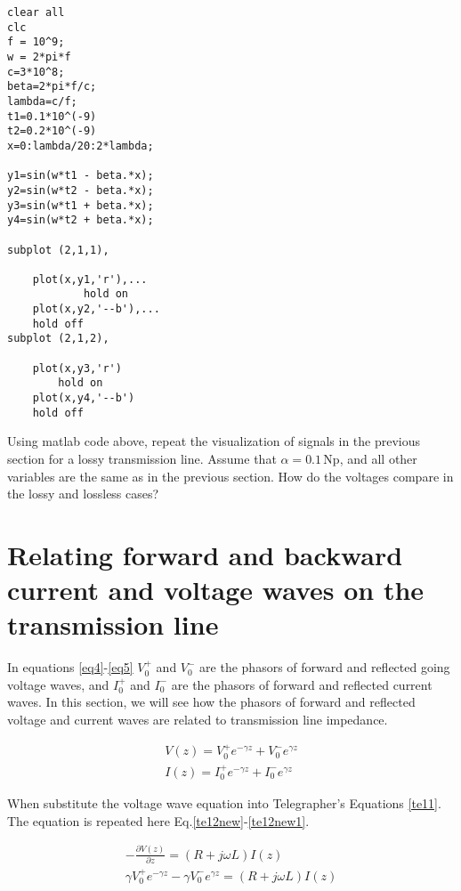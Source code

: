 \documentclass{ximera}
\begin{document}
\begin{verbatim}
clear all
clc
f = 10^9;
w = 2*pi*f
c=3*10^8;
beta=2*pi*f/c;
lambda=c/f;
t1=0.1*10^(-9)
t2=0.2*10^(-9)
x=0:lambda/20:2*lambda;

y1=sin(w*t1 - beta.*x);
y2=sin(w*t2 - beta.*x);
y3=sin(w*t1 + beta.*x);
y4=sin(w*t2 + beta.*x);

subplot (2,1,1),

    plot(x,y1,'r'),...
            hold on
    plot(x,y2,'--b'),...
    hold off
subplot (2,1,2),

    plot(x,y3,'r')
        hold on
    plot(x,y4,'--b')
    hold off
\end{verbatim}

Using matlab code above, repeat the visualization of signals  in the previous section for a lossy transmission line. Assume that $\alpha=0.1$\,Np, and all other variables are the same as in the previous section. How do the voltages compare in the lossy and lossless cases?

\section{Relating forward and backward current and voltage waves on
the transmission line}


In equations \ref{eq4}-\ref{eq5} $V_0^+$ and $V_0^-$ are the phasors of forward and
reflected going voltage waves, and $I_0^+$ and $I_0^-$ are the phasors of forward and
reflected  current waves. In this section, we will see how the phasors of forward and reflected voltage and
current waves are related to transmission line impedance.


\begin{eqnarray}
V(z)=V_0^+ e^{-\gamma z} + V_0^- e^{\gamma z}\label{eq4} \\
I(z)=I_0^+ e^{-\gamma z} + I_0^- e^{\gamma z}\label{eq5}
\end{eqnarray}




When substitute the voltage wave equation into Telegrapher's  Equations
\ref{te11}. The equation is repeated here  Eq.\ref{te12new}-\ref{te12new1}.




\begin{eqnarray}
-\frac{\partial V(z)}{\partial z} = (R+j\omega L) I(z) \label{te12new} \\
\gamma V_0^+ e^{-\gamma z} - \gamma V_0^- e^{\gamma z} = (R+ j \omega
L) I(z) \label{te12new1}
\end{eqnarray}
\end{document}
